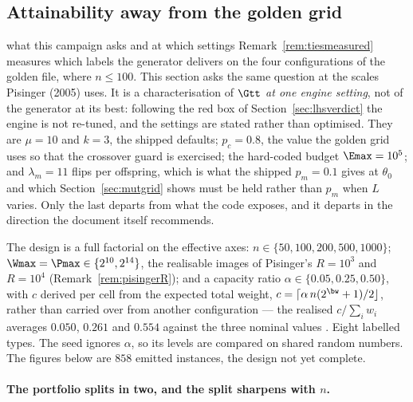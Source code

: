 \subsection{Attainability away from the golden grid}\label{sec:attainability}

\begin{whatis}{what this campaign asks and at which settings}
Remark~\ref{rem:tiesmeasured} measures which labels the generator delivers on the four
configurations of the golden file, where $n\le100$. This section asks the same question at the
scales Pisinger (2005) uses. It is a characterisation of $\Gtt$ \emph{at one engine setting},
not of the generator at its best: following the red box of Section~\ref{sec:lhsverdict} the
engine is not re-tuned, and the settings are stated rather than optimised. They are
$\mu=10$ and $k=3$, the shipped defaults; $p_c=0.8$, the value the golden grid uses so that the
crossover guard is exercised; the hard-coded budget $\Emax=10^{5}$; and $\lambda_m=11$ flips
per offspring, which is what the shipped $p_m=0.1$ gives at $\theta_0$ and which
Section~\ref{sec:mutgrid} shows must be held rather than $p_m$ when $L$ varies. Only the last
departs from what the code exposes, and it departs in the direction the document itself
recommends.
\end{whatis}

The design is a full factorial on the effective axes: $n\in\{50,100,200,500,1000\}$;
$\Wmax=\Pmax\in\{2^{10},2^{14}\}$, the realisable images of Pisinger's $R=10^{3}$ and
$R=10^{4}$ (Remark~\ref{rem:pisingerR}); and a capacity ratio $\alpha\in\{0.05,0.25,0.50\}$,
with $c$ derived per cell from the expected total weight, $c=\lceil\alpha\,n(2^{\bw}+1)/2\rfloor$,
rather than carried over from another configuration --- the realised $c/\sum_iw_i$ averages
$0.050$, $0.261$ and $0.554$ against the three nominal values . Eight labelled types.
The seed ignores $\alpha$, so its levels are compared on shared random numbers. The figures
below are $858$ emitted instances, the design not yet complete.

\paragraph{The portfolio splits in two, and the split sharpens with $n$.}

